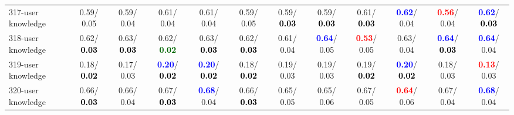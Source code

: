 \begin{table}[h]
\begin{center}
{\begin{tabular}{lc|c|c|c|c|c|c|c|c|c|c}
317-user knowledge &   0.59/  0.05 &   0.59/  0.04 &   0.61/  0.04 &   0.61/  0.04 &   0.59/  0.05 &   0.59/\textcolor{black}{\textbf{  0.03}} &   0.59/\textcolor{black}{\textbf{  0.03}} &   0.61/\textcolor{black}{\textbf{  0.03}} & \textcolor{blue}{\textbf{  0.62}}/  0.04 & \textcolor{red}{\textbf{  0.56}}/  0.04 & \textcolor{blue}{\textbf{  0.62}}/\textcolor{black}{\textbf{  0.03}} \\
318-user knowledge &   0.62/\textcolor{black}{\textbf{  0.03}} &   0.63/\textcolor{black}{\textbf{  0.03}} &   0.62/\textcolor{darkgreen}{\textbf{  0.02}} &   0.63/\textcolor{black}{\textbf{  0.03}} &   0.62/\textcolor{black}{\textbf{  0.03}} &   0.61/  0.04 & \textcolor{blue}{\textbf{  0.64}}/  0.05 & \textcolor{red}{\textbf{  0.53}}/  0.05 &   0.63/  0.04 & \textcolor{blue}{\textbf{  0.64}}/\textcolor{black}{\textbf{  0.03}} & \textcolor{blue}{\textbf{  0.64}}/  0.04 \\
319-user knowledge &   0.18/\textcolor{black}{\textbf{  0.02}} &   0.17/  0.03 & \textcolor{blue}{\textbf{  0.20}}/\textcolor{black}{\textbf{  0.02}} & \textcolor{blue}{\textbf{  0.20}}/\textcolor{black}{\textbf{  0.02}} &   0.18/\textcolor{black}{\textbf{  0.02}} &   0.19/  0.03 &   0.19/  0.03 &   0.19/\textcolor{black}{\textbf{  0.02}} & \textcolor{blue}{\textbf{  0.20}}/\textcolor{black}{\textbf{  0.02}} &   0.18/  0.03 & \textcolor{red}{\textbf{  0.13}}/  0.03 \\
320-user knowledge &   0.66/\textcolor{black}{\textbf{  0.03}} &   0.66/  0.04 &   0.67/\textcolor{black}{\textbf{  0.03}} & \textcolor{blue}{\textbf{  0.68}}/  0.04 &   0.66/\textcolor{black}{\textbf{  0.03}} &   0.65/  0.05 &   0.65/  0.06 &   0.67/  0.05 & \textcolor{red}{\textbf{  0.64}}/  0.06 &   0.67/  0.04 & \textcolor{blue}{\textbf{  0.68}}/  0.04 \\\end{tabular}}\label{stratsALCKappa9Allalla}
\end{center}
\end{table}
